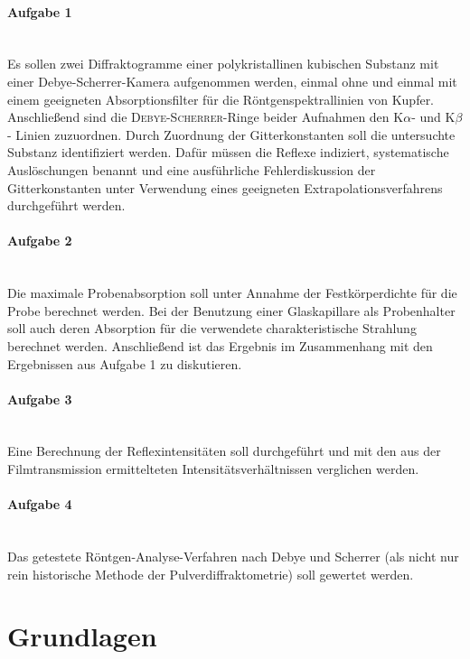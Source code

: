 \documentclass[a4paper,twoside,final]{article}
\begin{document}
\paragraph{Aufgabe 1}$~$\\
 Es sollen zwei Diffraktogramme einer polykristallinen kubischen Substanz mit einer Debye\--Scherrer\--Ka\-me\-ra aufgenommen werden, einmal ohne und einmal mit einem geeigneten Absorptionsfilter für die Röntgenspektrallinien von Kupfer. Anschließend sind die \textsc{Debye-Scherrer}-Ringe beider Aufnahmen den K$\alpha$- und K$\beta$- Linien zuzuordnen. Durch Zuordnung der Gitterkonstanten soll die untersuchte Substanz identifiziert werden. Dafür müssen die Reflexe indiziert, systematische Auslöschungen benannt und eine ausführliche Fehlerdiskussion der Gitterkonstanten unter Verwendung eines geeigneten Extrapolationsverfahrens durchgeführt werden.
\paragraph{Aufgabe 2}$~$\\
Die maximale Probenabsorption soll unter Annahme der Festkörperdichte für die Probe berechnet werden. Bei der Benutzung einer Glaskapillare als Probenhalter soll auch deren Absorption für die verwendete charakteristische Strahlung berechnet werden. Anschließend ist das Ergebnis im Zusammenhang mit den Ergebnissen aus Aufgabe 1 zu diskutieren.
\paragraph{Aufgabe 3}$~$\\
Eine Berechnung der Reflexintensitäten soll durchgeführt und mit den aus der Filmtransmission ermittelteten Intensitätsverhältnissen verglichen werden.
\paragraph{Aufgabe 4}$~$\\
Das getestete Röntgen-Analyse-Verfahren nach Debye und Scherrer (als nicht nur rein \glqq historische\grqq{} Methode der Pulverdiffraktometrie) soll gewertet werden.


\section{Grundlagen} \label{sec:Grundlagen}
\end{document}
